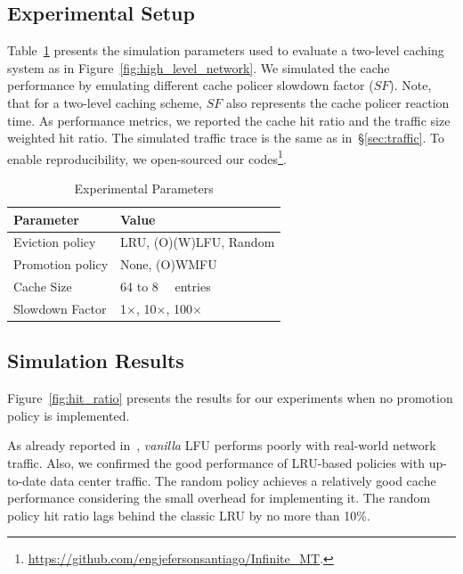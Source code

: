 \subsection{Experimental Setup}
Table~\ref{tab:setup} presents the simulation parameters used to evaluate a two-level caching system as in Figure~\ref{fig:high_level_network}.
We simulated the cache performance by emulating different cache policer slowdown factor ($SF$).
Note, that for a two-level caching scheme, $SF$ also represents the cache policer reaction time.
As performance metrics, we reported the cache hit ratio and the traffic size weighted hit ratio.
The simulated traffic trace is the same as in~\S\ref{sec:traffic}.
To enable reproducibility, we open-sourced our codes\footnote{\url{https://github.com/engjefersonsantiago/Infinite_MT}.}.


\begin{table}[]
	\centering
	\caption{Experimental Parameters}
	\label{tab:setup}
	\begin{tabular}{l|l}
		\toprule
		\textbf{Parameter}       & \textbf{Value}   \\
		\midrule
		Eviction policy            & LRU, (O)(W)LFU, Random			    \\
		Promotion policy            & None, (O)WMFU			    \\
		Cache Size              & 64 to \SI{8}{\kilo\nothing} entries  \\
		Slowdown Factor         & 1$\times$, 10$\times$, 100$\times$        \\
		\bottomrule
	\end{tabular}
\end{table}

\subsection{Simulation Results}
Figure~\ref{fig:hit_ratio} presents the results for our experiments when no promotion policy is implemented.

As already reported in~\cite{Kim:09}, \textit{vanilla} LFU performs poorly with real-world network traffic.
Also, we confirmed the good performance of LRU-based policies with up-to-date data center traffic. 
The random policy achieves a relatively good cache performance considering the small overhead for implementing it.
The random policy hit ratio lags behind the classic LRU by no more than 10\%.

